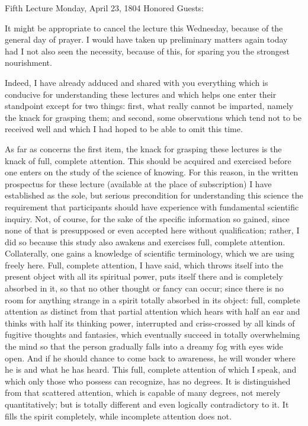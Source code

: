 Fifth Lecture
Monday, April 23, 1804
Honored Guests:

It might be appropriate to cancel the lecture this Wednesday,
because of the general day of prayer.
I would have taken up preliminary matters again today
had I not also seen the necessity, because of this,
for sparing you the strongest nourishment.

Indeed, I have already adduced and shared with you
everything which is conducive for understanding these lectures
and which helps one enter their standpoint except for two things:
first, what really cannot be imparted,
namely the knack for grasping them;
and second, some observations which tend
not to be received well and which
I had hoped to be able to omit this time.

As far as concerns the first item,
the knack for grasping these lectures is
the knack of full, complete attention.
This should be acquired and exercised
before one enters on the study of the science of knowing.
For this reason, in the written prospectus for these lecture
(available at the place of subscription)
I have established as the sole, but serious precondition
for understanding this science the requirement
that participants should have experience with
fundamental scientific inquiry.
Not, of course, for the sake of
the specific information so gained,
since none of that is presupposed
or even accepted here without qualification;
rather, I did so because this study also
awakens and exercises full, complete attention.
Collaterally, one gains a knowledge of scientific terminology,
which we are using freely here.
Full, complete attention, I have said,
which throws itself into the present object
with all its spiritual power,
puts itself there and is completely absorbed in it,
so that no other thought or fancy can occur;
since there is no room for anything strange
in a spirit totally absorbed in its object:
full, complete attention as distinct from
that partial attention
which hears with half an ear
and thinks with half its thinking power,
interrupted and criss-crossed by
all kinds of fugitive thoughts and fantasies,
which eventually succeed in totally overwhelming
the mind so that the person gradually falls
into a dreamy fog with eyes wide open.
And if he should chance to come back to awareness,
he will wonder where he is and what he has heard.
This full, complete attention of which I speak,
and which only those who possess can recognize, has no degrees.
It is distinguished from that scattered attention,
which is capable of many degrees, not merely quantitatively;
but is totally different and even logically contradictory to it.
It fills the spirit completely,
while incomplete attention does not.

